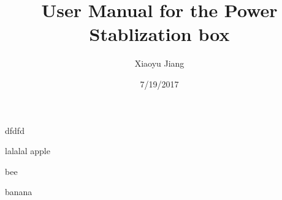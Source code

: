 \documentclass{article}
\title{User Manual for the Power Stablization box}
\author{Xiaoyu Jiang}
\date{7/19/2017}
\begin{document}
dfdfd

lalalal
apple

bee

banana
\end{document}
